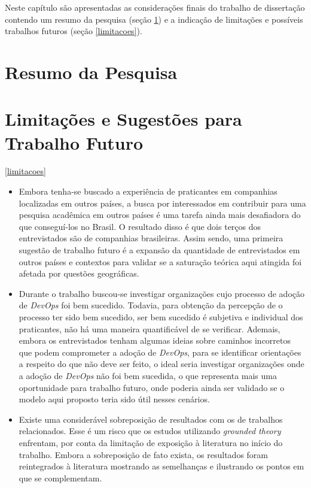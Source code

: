 Neste capítulo são apresentadas as considerações finais do trabalho de
dissertação contendo um resumo da pesquisa (seção \ref{resumo_pesquisa})
e a indicação de limitações e possíveis trabalhos futuros (seção \ref{limitacoes}).

\section{Resumo da Pesquisa}\label{resumo_pesquisa}

\section{Limitações e Sugestões para Trabalho Futuro}\ref{limitacoes}

\begin{itemize}
\item Embora tenha-se buscado a experiência de praticantes em companhias
localizadas em outros países, a busca por interessados em contribuir para uma
pesquisa acadêmica em outros países é uma tarefa ainda mais desafiadora do que
conseguí-los no Brasil. O resultado disso é que dois terços dos entrevistados
são de companhias brasileiras. Assim sendo, uma primeira sugestão de trabalho
futuro é a expansão da quantidade de entrevistados em outros países e contextos
para validar se a saturação teórica aqui atingida foi afetada por questões
geográficas.

\item Durante o trabalho buscou-se investigar organizações cujo processo de
adoção de {\it DevOps} foi bem sucedido. Todavia, para obtenção da percepção
de o processo ter sido bem sucedido,
ser bem sucedido é subjetiva e individual dos praticantes, não há uma maneira
quantificável de se verificar. Ademais, embora os entrevistados tenham algumas
ideias sobre caminhos incorretos que podem comprometer a adoção de {\it DevOps},
para se identificar orientações a respeito do que não deve ser feito, o ideal
seria investigar organizações onde a adoção de {\it DevOps} não foi bem
sucedida, o que representa mais uma oportunidade para trabalho futuro, onde
poderia ainda ser validado se o modelo aqui proposto teria sido útil nesses
cenários.

\item Existe uma considerável sobreposição de resultados com os de trabalhos
relacionados. Esse é um risco que os estudos utilizando {\it grounded theory}
enfrentam, por conta da limitação de exposição à literatura no início do
trabalho. Embora a sobreposição de fato exista, os resultados foram reintegrados
à literatura mostrando as semelhanças e ilustrando os pontos em que se
complementam.


\end{itemize}
